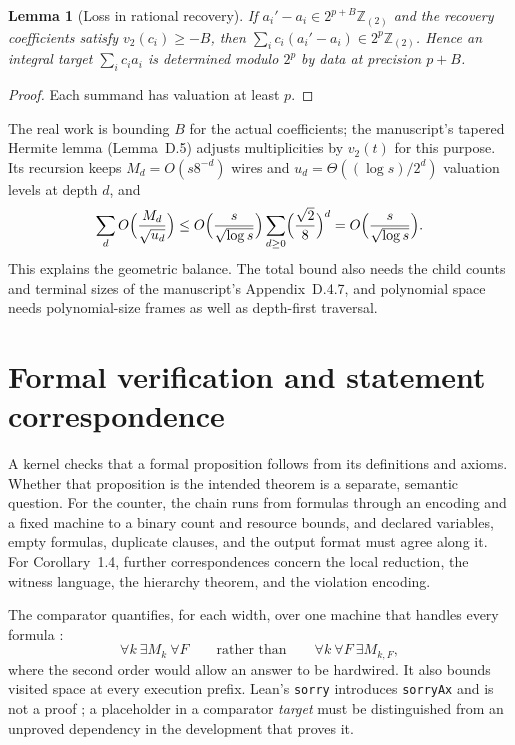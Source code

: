 \documentclass[11pt,reqno]{amsart}
\numberwithin{equation}{section}
\theoremstyle{plain}
\newtheorem{lemma}[theorem]{Lemma}
\theoremstyle{definition}
\theoremstyle{remark}
\newcommand{\Z}{\mathbb Z}
\newcommand{\valtwo}{v_2}
\begin{document}
\begin{lemma}[Loss in rational recovery]\label{lem:precision}
If $a_i'-a_i\in2^{p+B}\Z_{(2)}$ and the recovery coefficients satisfy
$\valtwo(c_i)\ge-B$, then $\sum_ic_i(a_i'-a_i)\in2^p\Z_{(2)}$. Hence an
integral target $\sum_ic_ia_i$ is determined modulo $2^p$ by data at
precision $p+B$.
\end{lemma}
\begin{proof}
Each summand has valuation at least $p$.
\end{proof}
The real work is bounding $B$ for the actual coefficients; the manuscript's
tapered Hermite lemma (Lemma~D.5) adjusts multiplicities by $\valtwo(t)$ for
this purpose. Its recursion keeps $M_d=O(s8^{-d})$ wires and
$u_d=\Theta((\log s)/2^d)$ valuation levels at depth $d$, and
\begin{equation}\label{eq:geometric}
 \sum_dO\Bigl(\frac{M_d}{\sqrt{u_d}}\Bigr)
 \le O\Bigl(\frac s{\sqrt{\log s}}\Bigr)\sum_{d\ge0}\Bigl(\frac{\sqrt2}8\Bigr)^d
 =O\Bigl(\frac s{\sqrt{\log s}}\Bigr).
\end{equation}
This explains the geometric balance. The total bound also needs the child
counts and terminal sizes of the manuscript's Appendix~D.4.7, and polynomial
space needs polynomial-size frames as well as depth-first traversal.

\section{Formal verification and statement correspondence}
\label{sec:verification}
A kernel checks that a formal proposition follows from its definitions and
axioms. Whether that proposition is the intended theorem is a separate,
semantic question. For the counter, the chain runs from formulas through an
encoding and a fixed machine to a binary count and resource bounds, and
declared variables, empty formulas, duplicate clauses, and the output format
must agree along it. For Corollary~1.4, further correspondences concern the
local reduction, the witness language, the hierarchy theorem, and the
violation encoding.

The comparator quantifies, for each width, over one machine that handles
every formula \cite{OpenAIComparator}:
\[
 \forall k\ \exists M_k\ \forall F\qquad\text{rather than}\qquad
 \forall k\ \forall F\ \exists M_{k,F},
\]
where the second order would allow an answer to be hardwired. It also bounds
visited space at every execution prefix. Lean's \texttt{sorry} introduces
\texttt{sorryAx} and is not a proof \cite{LeanReference}; a placeholder in a
comparator \emph{target} must be distinguished from an unproved dependency
in the development that proves it.
\end{document}
